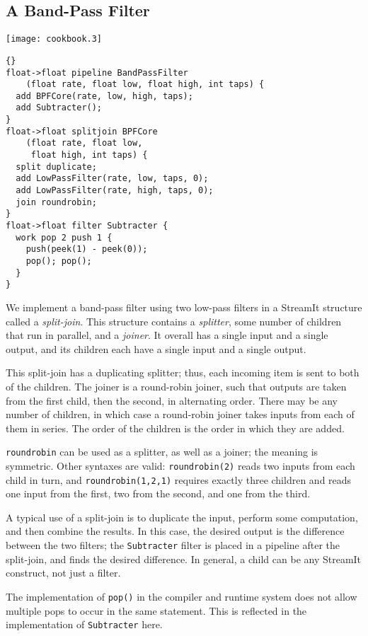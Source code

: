 \clearpage
\subsection{A Band-Pass Filter}

\begin{textpic}{\texttt{[image: cookbook.3]}}
\begin{lstlisting}{}
float->float pipeline BandPassFilter 
    (float rate, float low, float high, int taps) {
  add BPFCore(rate, low, high, taps);
  add Subtracter();
}
float->float splitjoin BPFCore 
    (float rate, float low, 
     float high, int taps) {
  split duplicate;
  add LowPassFilter(rate, low, taps, 0);
  add LowPassFilter(rate, high, taps, 0);
  join roundrobin;
}
float->float filter Subtracter {
  work pop 2 push 1 {
    push(peek(1) - peek(0));
    pop(); pop();
  }
}
\end{lstlisting}
\end{textpic}

We implement a band-pass filter using two low-pass filters in a
StreamIt structure called a \emph{split-join}.  This structure
contains a \emph{splitter}, some number of children that run in
parallel, and a \emph{joiner}.  It overall has a single input and a
single output, and its children each have a single input and a single
output.

This split-join has a duplicating splitter; thus, each incoming item
is sent to both of the children.  The joiner is a round-robin joiner,
such that outputs are taken from the first child, then the second, in
alternating order.  There may be any number of children, in which case
a round-robin joiner takes inputs from each of them in series.  The
order of the children is the order in which they are added.

\lstinline|roundrobin| can be used as a splitter, as well as a joiner;
the meaning is symmetric.  Other syntaxes are valid:
\lstinline|roundrobin(2)| reads two inputs from each child in turn,
and \lstinline|roundrobin(1,2,1)| requires exactly three children and
reads one input from the first, two from the second, and one from the
third.

A typical use of a split-join is to duplicate the input, perform some
computation, and then combine the results.  In this case, the desired
output is the difference between the two filters; the
\lstinline|Subtracter| filter is placed in a pipeline after the
split-join, and finds the desired difference.  In general, a child can
be any StreamIt construct, not just a filter.

The implementation of \lstinline|pop()| in the compiler and runtime
system does not allow multiple pops to occur in the same statement.
This is reflected in the implementation of \lstinline|Subtracter|
here.